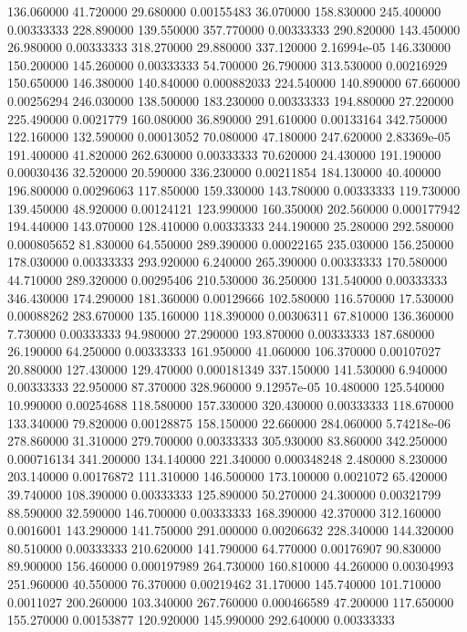 136.060000	41.720000	29.680000	0.00155483
36.070000	158.830000	245.400000	0.00333333
228.890000	139.550000	357.770000	0.00333333
290.820000	143.450000	26.980000	0.00333333
318.270000	29.880000	337.120000	2.16994e-05
146.330000	150.200000	145.260000	0.00333333
54.700000	26.790000	313.530000	0.00216929
150.650000	146.380000	140.840000	0.000882033
224.540000	140.890000	67.660000	0.00256294
246.030000	138.500000	183.230000	0.00333333
194.880000	27.220000	225.490000	0.0021779
160.080000	36.890000	291.610000	0.00133164
342.750000	122.160000	132.590000	0.00013052
70.080000	47.180000	247.620000	2.83369e-05
191.400000	41.820000	262.630000	0.00333333
70.620000	24.430000	191.190000	0.00030436
32.520000	20.590000	336.230000	0.00211854
184.130000	40.400000	196.800000	0.00296063
117.850000	159.330000	143.780000	0.00333333
119.730000	139.450000	48.920000	0.00124121
123.990000	160.350000	202.560000	0.000177942
194.440000	143.070000	128.410000	0.00333333
244.190000	25.280000	292.580000	0.000805652
81.830000	64.550000	289.390000	0.00022165
235.030000	156.250000	178.030000	0.00333333
293.920000	6.240000	265.390000	0.00333333
170.580000	44.710000	289.320000	0.00295406
210.530000	36.250000	131.540000	0.00333333
346.430000	174.290000	181.360000	0.00129666
102.580000	116.570000	17.530000	0.00088262
283.670000	135.160000	118.390000	0.00306311
67.810000	136.360000	7.730000	0.00333333
94.980000	27.290000	193.870000	0.00333333
187.680000	26.190000	64.250000	0.00333333
161.950000	41.060000	106.370000	0.00107027
20.880000	127.430000	129.470000	0.000181349
337.150000	141.530000	6.940000	0.00333333
22.950000	87.370000	328.960000	9.12957e-05
10.480000	125.540000	10.990000	0.00254688
118.580000	157.330000	320.430000	0.00333333
118.670000	133.340000	79.820000	0.00128875
158.150000	22.660000	284.060000	5.74218e-06
278.860000	31.310000	279.700000	0.00333333
305.930000	83.860000	342.250000	0.000716134
341.200000	134.140000	221.340000	0.000348248
2.480000	8.230000	203.140000	0.00176872
111.310000	146.500000	173.100000	0.0021072
65.420000	39.740000	108.390000	0.00333333
125.890000	50.270000	24.300000	0.00321799
88.590000	32.590000	146.700000	0.00333333
168.390000	42.370000	312.160000	0.0016001
143.290000	141.750000	291.000000	0.00206632
228.340000	144.320000	80.510000	0.00333333
210.620000	141.790000	64.770000	0.00176907
90.830000	89.900000	156.460000	0.000197989
264.730000	160.810000	44.260000	0.00304993
251.960000	40.550000	76.370000	0.00219462
31.170000	145.740000	101.710000	0.0011027
200.260000	103.340000	267.760000	0.000466589
47.200000	117.650000	155.270000	0.00153877
120.920000	145.990000	292.640000	0.00333333
